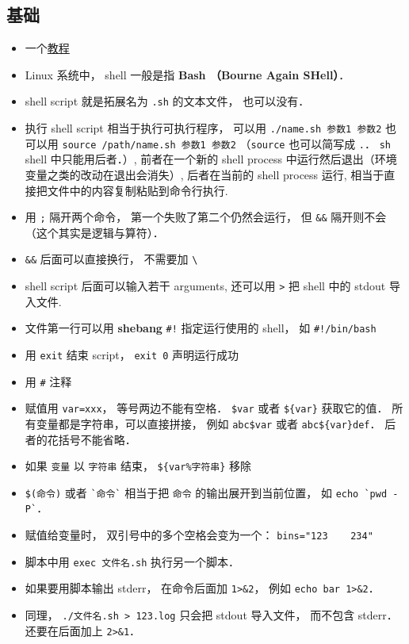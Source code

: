 
\begin{issues}
\issueDraft
\end{issues}


\subsection{基础}
\begin{itemize}
\item 一个\href{https://tldp.org/LDP/abs/html/why-shell.html}{教程}
\item Linux 系统中， shell 一般是指 \textbf{Bash （Bourne Again SHell）}．
\item shell script 就是拓展名为 \verb`.sh` 的文本文件， 也可以没有．
\item 执行 shell script 相当于执行可执行程序， 可以用 \verb`./name.sh 参数1 参数2` 也可以用 \verb`source /path/name.sh 参数1 参数2` （\verb|source| 也可以简写成 \verb|.|． \verb|sh| shell 中只能用后者．）, 前者在一个新的 shell process 中运行然后退出（环境变量之类的改动在退出会消失）, 后者在当前的 shell process 运行, 相当于直接把文件中的内容复制粘贴到命令行执行.
\item 用 \verb|;| 隔开两个命令， 第一个失败了第二个仍然会运行， 但 \verb|&&| 隔开则不会（这个其实是逻辑与算符）．
\item \verb|&&| 后面可以直接换行， 不需要加 \verb|\|
\item shell script 后面可以输入若干 arguments, 还可以用 \verb`>` 把 shell 中的 stdout 导入文件.
\item 文件第一行可以用 \textbf{shebang} \verb`#!` 指定运行使用的 shell， 如 \verb`#!/bin/bash`
\item 用 \verb|exit| 结束 script， \verb`exit 0` 声明运行成功
\item 用 \verb`#` 注释
\item 赋值用 \verb`var=xxx`， 等号两边不能有空格． \verb|$var| 或者 \verb|${var}| 获取它的值． 所有变量都是字符串，可以直接拼接， 例如 \verb|abc$var| 或者 \verb|abc${var}def|． 后者的花括号不能省略．
\item 如果 \verb|变量| 以 \verb|字符串| 结束， \verb|${var%字符串}| 移除
\item \verb|$(命令)| 或者 \verb|`命令`| 相当于把 \verb|命令| 的输出展开到当前位置， 如 \verb|echo `pwd -P`|．
\item 赋值给变量时， 双引号中的多个空格会变为一个： \verb|bins="123    234"|
\item 脚本中用 \verb|exec 文件名.sh| 执行另一个脚本．
\item 如果要用脚本输出 stderr， 在命令后面加 \verb|1>&2|， 例如 \verb|echo bar 1>&2|．
\item 同理， \verb|./文件名.sh > 123.log| 只会把 stdout 导入文件， 而不包含 stderr． 还要在后面加上 \verb|2>&1|．
\end{itemize}


